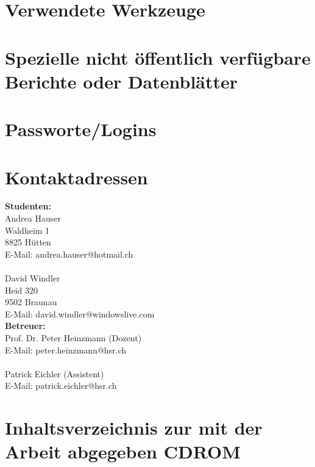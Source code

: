 \documentclass[12pt, a4paper]{report}
\begin{document}
	 

	\chapter{Verwendete Werkzeuge}
	
	
	
	\chapter{Spezielle nicht öffentlich verfügbare Berichte oder Datenblätter}
	
	\chapter{Passworte/Logins}
	
	\chapter{Kontaktadressen}
	\begin{multicols}{2}
	\noindent \textbf{Studenten:}
	\\
	Andrea Hauser\\
	Waldheim 1\\
	8825 Hütten\\
	E-Mail: andrea.hauser@hotmail.ch\\
	\\
	David Windler\\
	Heid 320\\
	9502 Braunau\\
	\columnbreak
	E-Mail: david.windler@windowslive.com\\
	\textbf{Betreuer:}\\
	Prof. Dr. Peter Heinzmann (Dozent)\\
	E-Mail: peter.heinzmann@hsr.ch\\
	\\
	Patrick Eichler (Assistent)\\
	E-Mail: patrick.eichler@hsr.ch\\
	
	\end{multicols}
	
	
	\chapter{Inhaltsverzeichnis zur mit der Arbeit abgegeben CDROM}
	
	
	
	
	
	
	
	
	
	
\end{document}
